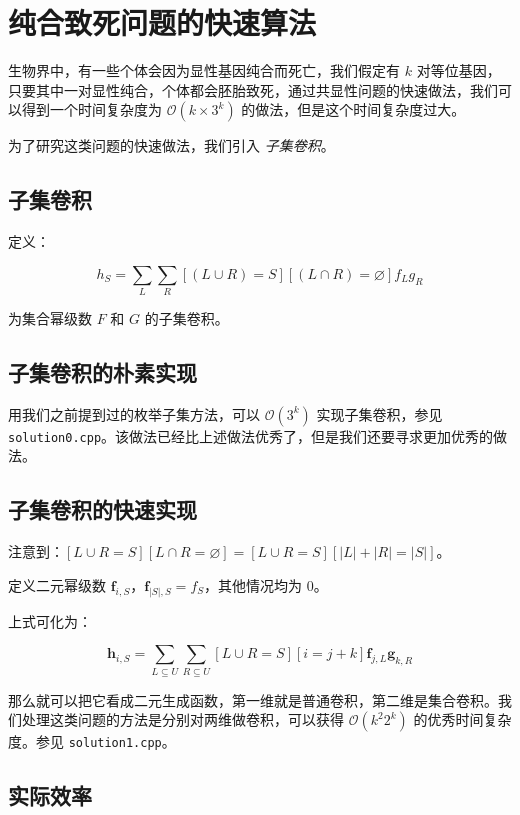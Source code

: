\documentclass[12pt]{article} %
\begin{document}
\newpage

\section{纯合致死问题的快速算法}

生物界中，有一些个体会因为显性基因纯合而死亡，我们假定有 $k$ 对等位基因，只要其中一对显性纯合，个体都会胚胎致死，通过共显性问题的快速做法，我们可以得到一个时间复杂度为 $\mathcal O(k \times 3^k)$ 的做法，但是这个时间复杂度过大。

为了研究这类问题的快速做法，我们引入 \textsl{子集卷积}。

\subsection{子集卷积}

定义：

$$h_S =\sum_{L} \sum_{R} [(L \cup R) = S][(L \cap R)=\varnothing] f_L g_R$$

为集合幂级数 $F$ 和 $G$ 的子集卷积。

\subsection{子集卷积的朴素实现}

用我们之前提到过的枚举子集方法，可以 $\mathcal O(3^k)$ 实现子集卷积，参见 \texttt{solution0.cpp}。该做法已经比上述做法优秀了，但是我们还要寻求更加优秀的做法。

\subsection{子集卷积的快速实现}

注意到：$[L\cup R=S][L\cap R=\varnothing]=[L\cup R=S][|L|+|R|=|S|]$。

定义二元幂级数 $\mathbf f_{i,S}$，$\mathbf f_{|S|,S}=f_{S}$，其他情况均为 $0$。

上式可化为：

$$\mathbf h_{i,S}=\sum_{L\subseteq U} \sum_{R\subseteq U} [L \cup R=S][i=j+k] \mathbf f_{j,L} \mathbf g_{k,R}$$

那么就可以把它看成二元生成函数，第一维就是普通卷积，第二维是集合卷积。我们处理这类问题的方法是分别对两维做卷积，可以获得 $\mathcal O(k^2 2^k)$ 的优秀时间复杂度。参见 \texttt{solution1.cpp}。

\subsection{实际效率}
\end{document}
